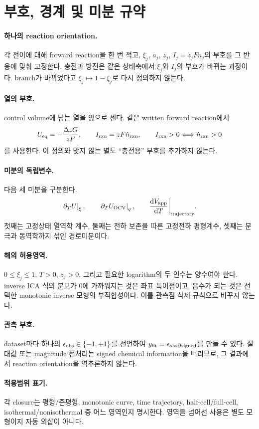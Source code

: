 \section{부호, 경계 및 미분 규약}\label{ASM-CONVENTIONS}

\paragraph{ 하나의 reaction orientation.}
각 전이에 대해 forward reaction을 한 번 적고, $\xi_j$, $a_j$, $z_j$,
$I_j=z_jF\dot n_j$의 부호를 그 반응에 맞춰 고정한다. 충전과 방전은
같은 상태축에서 $\dot\xi_j$와 $I_j$의 부호가 바뀌는 과정이다.
branch가 바뀌었다고 $\xi_j\mapsto1-\xi_j$로 다시 정의하지 않는다.

\paragraph{ 열의 부호.}
control volume에 남는 열을 양으로 센다. 같은 written forward
reaction에서
\[
U_{\mathrm{eq}}=-\frac{\Delta_rG}{zF},\qquad
I_{\rm rxn}=zF\dot n_{\rm rxn},\qquad
I_{\rm rxn}>0\Longleftrightarrow\dot n_{\rm rxn}>0
\]
를 사용한다. 이 정의와 맞지 않는 별도 ``충전용'' 부호를 추가하지
않는다.

\paragraph{ 미분의 독립변수.}
다음 세 미분을 구분한다.
\[
\left.\partial_T U\right|_{\xi},\qquad
\left.\partial_T U_{\rm OCV}\right|_q,\qquad
\frac{\mathrm d V_{\mathrm{app}}}{\mathrm d T}\bigg|_{\rm trajectory}.
\]
첫째는 고정상태 열역학 계수, 둘째는 전하 보존을 따른 고정전하
평형계수, 셋째는 분극과 동역학까지 섞인 경로미분이다.

\paragraph{ 해의 허용영역.}
$0\le\xi_j\le1$, $T>0$, $z_j>0$, 그리고 필요한 logarithm의 두
인수는 양수여야 한다. inverse ICA 식의 분모가 0에 가까워지는 것은
좌표 특이점이고, 음수가 되는 것은 선택한 monotonic inverse
모형의 부적합성이다. 이를 관측점 삭제 규칙으로 바꾸지 않는다.

\paragraph{ 관측 부호.}
dataset마다 하나의 $\epsilon_{\mathrm{obs}}\in\{-1,+1\}$를 선언하여
$y_\mathrm{fit}=\epsilon_{\mathrm{obs}} y_\mathrm{signed}$를 만들 수 있다.
절대값 또는 magnitude 전처리는 signed chemical information을
버리므로, 그 결과에서 reaction orientation을 역추론하지 않는다.

\paragraph{ 적용범위 표기.}
각 closure는 평형/준평형, monotonic curve, time trajectory,
half-cell/full-cell, isothermal/nonisothermal 중 어느 영역인지
명시한다. 영역을 넘어선 사용은 별도 모형이지 자동 외삽이 아니다.
